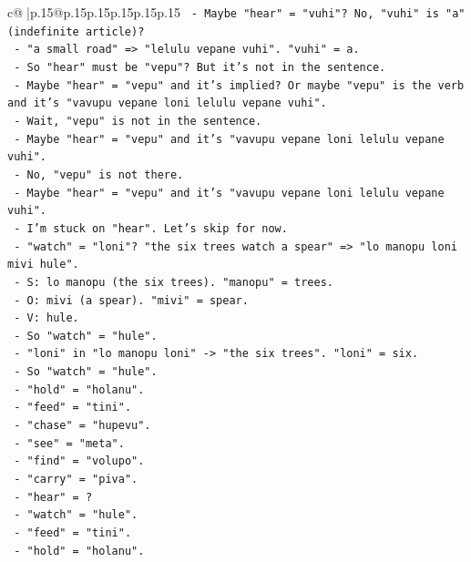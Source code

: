\documentclass{article}
\begin{document}
{\begin{supertabular}{c@{$\;$}|p{.15\linewidth}@{}p{.15\linewidth}p{.15\linewidth}p{.15\linewidth}p{.15\linewidth}p{.15\linewidth}}
{{{\texttt{       {-} Maybe "hear" = "vuhi"? No, "vuhi" is "a" (indefinite article)?} \\
\texttt{       {-} "a small road" => "lelulu vepane vuhi". "vuhi" = a.} \\
\texttt{       {-} So "hear" must be "vepu"? But it's not in the sentence.} \\
\texttt{       {-} Maybe "hear" = "vepu" and it's implied? Or maybe "vepu" is the verb and it's "vavupu vepane loni lelulu vepane vuhi".} \\
\texttt{       {-} Wait, "vepu" is not in the sentence.} \\
\texttt{       {-} Maybe "hear" = "vepu" and it's "vavupu vepane loni lelulu vepane vuhi".} \\
\texttt{       {-} No, "vepu" is not there.} \\
\texttt{       {-} Maybe "hear" = "vepu" and it's "vavupu vepane loni lelulu vepane vuhi".} \\
\texttt{       {-} I'm stuck on "hear". Let's skip for now.} \\
\texttt{       {-} "watch" = "loni"? "the six trees watch a spear" => "lo manopu loni mivi hule".} \\
\texttt{       {-} S: lo manopu (the six trees). "manopu" = trees.} \\
\texttt{       {-} O: mivi (a spear). "mivi" = spear.} \\
\texttt{       {-} V: hule.} \\
\texttt{       {-} So "watch" = "hule".} \\
\texttt{       {-} "loni" in "lo manopu loni" {-}> "the six trees". "loni" = six.} \\
\texttt{       {-} So "watch" = "hule".} \\
\texttt{       {-} "hold" = "holanu".} \\
\texttt{       {-} "feed" = "tini".} \\
\texttt{       {-} "chase" = "hupevu".} \\
\texttt{       {-} "see" = "meta".} \\
\texttt{       {-} "find" = "volupo".} \\
\texttt{       {-} "carry" = "piva".} \\
\texttt{       {-} "hear" = ?} \\
\texttt{       {-} "watch" = "hule".} \\
\texttt{       {-} "feed" = "tini".} \\
\texttt{       {-} "hold" = "holanu".} \\
}}}
\end{supertabular}}
\end{document}
